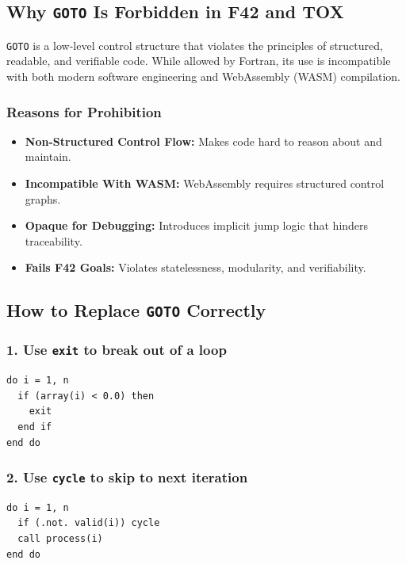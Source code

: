 \documentclass{article}
\begin{document}
\vspace{1em}

\subsection{Why \texttt{GOTO} Is Forbidden in F42 and TOX}

\texttt{GOTO} is a low-level control structure that violates the principles of structured, readable, and verifiable code. While allowed by Fortran, its use is incompatible with both modern software engineering and WebAssembly (WASM) compilation.

\subsubsection*{Reasons for Prohibition}
\begin{itemize}
  \item \textbf{Non-Structured Control Flow:} Makes code hard to reason about and maintain.
  \item \textbf{Incompatible With WASM:} WebAssembly requires structured control graphs.
  \item \textbf{Opaque for Debugging:} Introduces implicit jump logic that hinders traceability.
  \item \textbf{Fails F42 Goals:} Violates statelessness, modularity, and verifiability.
\end{itemize}

\subsection{How to Replace \texttt{GOTO} Correctly}

\subsubsection*{1. Use \texttt{exit} to break out of a loop}
\begin{verbatim}
do i = 1, n
  if (array(i) < 0.0) then
    exit
  end if
end do
\end{verbatim}

\subsubsection*{2. Use \texttt{cycle} to skip to next iteration}
\begin{verbatim}
do i = 1, n
  if (.not. valid(i)) cycle
  call process(i)
end do
\end{verbatim}
\end{document}
